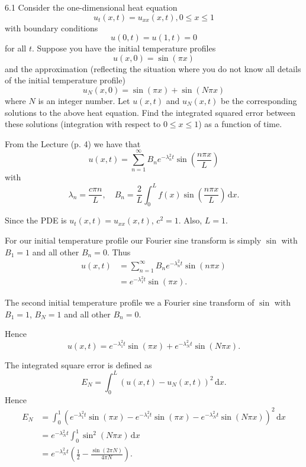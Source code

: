 
\begin{problem}{6.1}
  Consider the one-dimensional heat equation
\[ 
u_t(x,t) = u_{x x}(x,t), 0 \leq x \leq 1
\]
with boundary conditions
\[ 
u(0,t) = u(1,t) = 0
\]
for all $t$.
Suppose you have the initial temperature profiles
\[ 
u(x,0) = \sin(\pi x)
\]
and the approximation (reflecting the situation where you do not know all details of the initial temperature profile)
\[ 
u_N(x,0) = \sin (\pi x) + \sin (N \pi x)
\]
where $N$ is an integer number.
Let $u(x,t)$ and $u_N(x,t)$ be the corresponding solutions to the above heat equation.
Find the integrated squared error between these solutions (integration with respect to $0 \leq x \leq 1$) as a function of time.
\end{problem}

\begin{derivation}
  From the Lecture (p. 4) we have that
  \begin{equation*}
    u(x,t) = \sum_{n = 1}^{\infty} B_n e^{-\lambda_n^2 t }\sin \left( \frac{n \pi x }{L} \right)
  \end{equation*}
  with
  \begin{equation*}
    \lambda_n = \frac{c \pi n}{L}, \quad B_n = \frac{2}{L} \int_{0}^{L} f(x) \sin \left( \frac{n \pi x}{L} \right) \, \mathrm{d}x 
  .\end{equation*}
  
  Since the PDE is $u_t(x,t) = u_{x x}(x,t)$, $c^2 = 1$.
  Also, $L = 1$.
  
  For our initial temperature profile our Fourier sine transform is simply $\sin$ with $B_1 = 1$ and all other $B_n = 0$.
  Thus
  \begin{align*}
    u(x,t) &= \sum_{n = 1}^{\infty} B_n e^{- \lambda_n^2 t} \sin (n \pi x) \\
    &= e^{-\lambda_1^2 t}\sin(\pi x)
  .\end{align*}

  The second initial temperature profile we a Fourier sine transform of $\sin$ with $B_1 = 1$, $B_N = 1$ and all other $B_n = 0$.

  Hence
  \begin{equation*}
    u(x,t) = e^{-\lambda_1^2 t} \sin (\pi x) + e^{- \lambda_N^2 t} \sin (N \pi x)
  .\end{equation*}
  
  The integrated square error is defined as
  \begin{equation*}
    E_N = \int_{0}^{L} \left( u(x,t) - u_N(x,t) \right)^2 \, \mathrm{d}x
  .\end{equation*}
  Hence
  \begin{align*}
    E_N &= \int_{0}^{1} \left( e^{- \lambda_1^2 t} \sin (\pi x) - e^{-\lambda_1^2 t} \sin (\pi x) - e^{-\lambda_N^2 t} \sin (N\pi x) \right)^2 \, \mathrm{d}x  \\
    &= e^{-\lambda_N ^2 t} \int_{0}^{1} \sin^2(N \pi x) \, \mathrm{d}x \\
    &= e^{-\lambda_N^2 t}\left( \frac{1}{2}-\frac{\sin (2 \pi  N)}{4 \pi  N} \right)
  .\end{align*}
\end{derivation}

